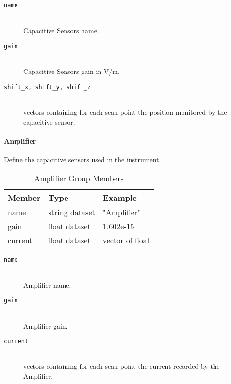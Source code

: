 \begin{description}
\item[\tt {name}] \hfill \\
{Capacitive Sensors name.}

\item[\tt {gain}] \hfill \\
{Capacitive Sensors gain in V/m.}

\item[\tt {shift\_x, shift\_y, shift\_z}] \hfill \\
{vectors containing for each scan point the position monitored by the capacitive sensor.}

\end{description}

\paragraph{Amplifier}
\label{table:amplifier}

Define the capacitive sensors used in the instrument.

\begin{table}[h!]\sffamily \footnotesize
\centering
\caption{Amplifier Group Members}
\begin{tabular}{l l l}
\toprule
\bfseries Member     & \bfseries Type & \bfseries Example \\
\midrule
name & string dataset & "Amplifier" \\
gain & float dataset & 1.602e-15 \\
current & float dataset &  vector of float  \\
\bottomrule
\end{tabular}
\end{table}

\begin{description}
\item[\tt {name}] \hfill \\
{Amplifier name.}

\item[\tt {gain}] \hfill \\
{Amplifier gain.}

\item[\tt {current}] \hfill \\
{vectors containing for each scan point the current recorded  by the Amplifier.}

\end{description}



